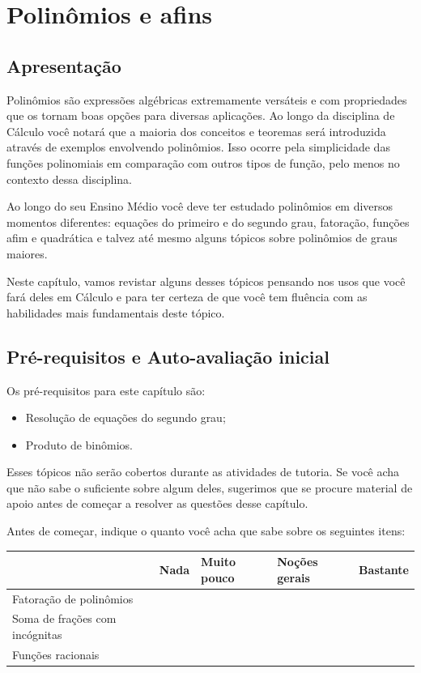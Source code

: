 \documentclass[main.tex]{subfiles}
\begin{document}
\chapter{Polinômios e afins}

\section{Apresentação}

Polinômios são expressões algébricas extremamente versáteis e com propriedades que os tornam boas opções para diversas aplicações. Ao longo da disciplina de Cálculo você notará que a maioria dos conceitos e teoremas será introduzida através de exemplos envolvendo polinômios. Isso ocorre pela simplicidade das funções polinomiais em comparação com outros tipos de função, pelo menos no contexto dessa disciplina.

Ao longo do seu Ensino Médio você deve ter estudado polinômios em diversos momentos diferentes: equações do primeiro e do segundo grau, fatoração, funções afim e quadrática e talvez até mesmo alguns tópicos sobre polinômios de graus maiores.

Neste capítulo, vamos revistar alguns desses tópicos pensando nos usos que você fará deles em Cálculo e para ter certeza de que você tem fluência com as habilidades mais fundamentais deste tópico.

\newpage

\section{Pré-requisitos e Auto-avaliação inicial}

Os pré-requisitos para este capítulo são:
\begin{itemize}
 \item Resolução de equações do segundo grau;
 \item Produto de binômios.
\end{itemize}

Esses tópicos não serão cobertos durante as atividades de tutoria. Se você acha que não sabe o suficiente sobre algum deles, sugerimos que se procure material de apoio antes de começar a resolver as questões desse capítulo.

\paraFolhaAvaliacoes

Antes de começar, indique o quanto você acha que sabe sobre os seguintes itens:

\begin{center}
 \begin{tabular}{|p{35mm}||p{15mm}|p{15mm}|p{15mm}|p{15mm}|} 
 \hline
   & Nada & Muito pouco & Noções gerais & Bastante\\
 \hline
 Fatoração de polinômios &  &  &  &  \\ 
 \hline
 Soma de frações com incógnitas &  &  &  &  \\
 \hline
 Funções racionais &  &  &  &  \\
 \hline
\end{tabular}
\end{center}
\end{document}

